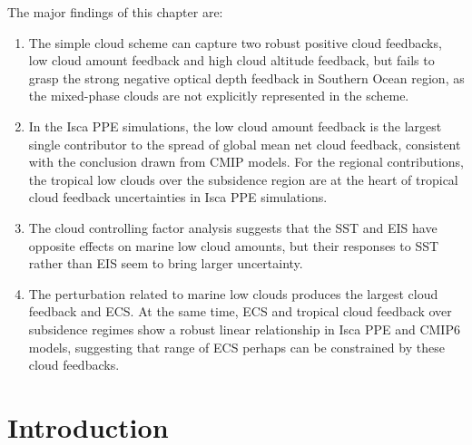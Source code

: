 The major findings of this chapter are:
\begin{enumerate}
    \item The simple cloud scheme can capture two robust positive cloud feedbacks, low cloud amount feedback and high cloud altitude feedback, but fails to grasp the strong negative optical depth feedback in Southern Ocean region, as the mixed-phase clouds are not explicitly represented in the scheme.
    \item In the Isca PPE simulations, the low cloud amount feedback is the largest single contributor to the spread of global mean net cloud feedback, consistent with the conclusion drawn from CMIP models. For the regional contributions, the tropical low clouds over the subsidence region are at the heart of tropical cloud feedback uncertainties in Isca PPE simulations.
    \item The cloud controlling factor analysis suggests that the SST and EIS have opposite effects on marine low cloud amounts, but their responses to SST rather than EIS seem to bring larger uncertainty.
    \item The perturbation related to marine low clouds produces the largest cloud feedback and ECS. At the same time, ECS and tropical cloud feedback over subsidence regimes show a robust linear relationship in Isca PPE and CMIP6 models, suggesting that range of ECS perhaps can be constrained by these cloud feedbacks.
\end{enumerate}

\section{Introduction}
\label{sec:cld_fbk_chap_intro}

